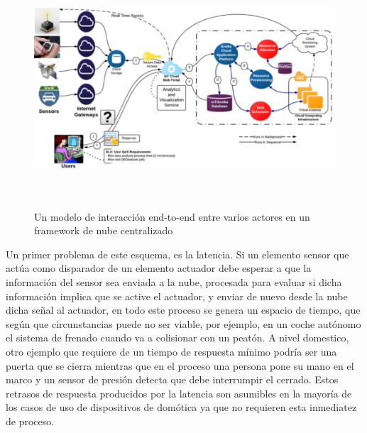 \vspace{0.5cm}
\begin{figure}[hbt!]
\label{iotCloundComputing}
\centering
\includegraphics[height=3.5in]{figures/iotCloudComputing.jpg}
\caption[Un modelo de interacción end-to-end entre varios actores en un \gls{framework} de nube centralizado]{Un modelo de interacción end-to-end entre varios actores en un \gls{framework} de nube centralizado}
\end{figure}

Un primer problema de este esquema, es la latencia. Si un elemento sensor que actúa como disparador de un elemento actuador debe esperar a que la información del sensor sea enviada a la nube, procesada para evaluar si dicha información implica que se active el actuador, y enviar de nuevo desde la nube dicha señal al actuador, en todo este proceso se genera un espacio de tiempo, que según que circunstancias puede no ser viable, por ejemplo, en un coche autónomo el sistema de frenado cuando va a colisionar con un peatón. A nivel domestico, otro ejemplo que requiere de un tiempo de respuesta mínimo podría ser una puerta que se cierra mientras que en el proceso una persona pone su mano en el marco y un sensor de presión detecta que debe interrumpir el cerrado. Estos retrasos de respuesta producidos por la latencia son asumibles en la mayoría de los casos de uso de dispositivos de domótica ya que no requieren esta inmediatez de proceso.

\vspace{1cm}


